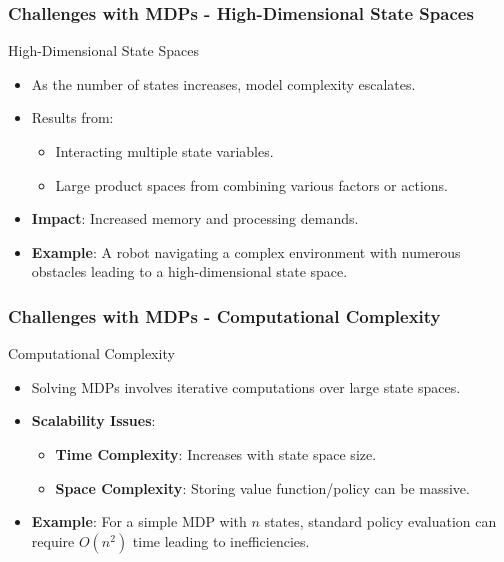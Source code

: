 \documentclass[aspectratio=169]{beamer}
\begin{document}
\begin{frame}[fragile]
    \frametitle{Challenges with MDPs - High-Dimensional State Spaces}
    \begin{block}{High-Dimensional State Spaces}
        \begin{itemize}
            \item As the number of states increases, model complexity escalates. 
            \item Results from:
                \begin{itemize}
                    \item Interacting multiple state variables.
                    \item Large product spaces from combining various factors or actions.
                \end{itemize}
            \item \textbf{Impact}: Increased memory and processing demands.
            \item \textbf{Example}: A robot navigating a complex environment with numerous obstacles leading to a high-dimensional state space.
        \end{itemize}
    \end{block}
\end{frame}

\begin{frame}[fragile]
    \frametitle{Challenges with MDPs - Computational Complexity}
    \begin{block}{Computational Complexity}
        \begin{itemize}
            \item Solving MDPs involves iterative computations over large state spaces.
            \item \textbf{Scalability Issues}:
                \begin{itemize}
                    \item \textbf{Time Complexity}: Increases with state space size.
                    \item \textbf{Space Complexity}: Storing value function/policy can be massive.
                \end{itemize}
            \item \textbf{Example}: For a simple MDP with \( n \) states, standard policy evaluation can require \( O(n^2) \) time leading to inefficiencies.
        \end{itemize}
    \end{block}
\end{frame}
\end{document}
